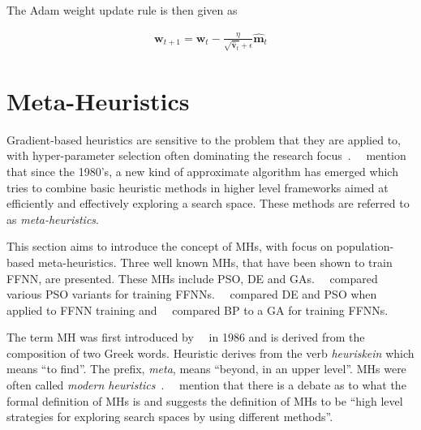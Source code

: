 The \acs{Adam} weight update rule is then given as

\begin{equation}
      \label{eq:heuristics:gd:adam}
      \begin{split}
            \boldsymbol{w}_{t+1} = \boldsymbol{w}_{t} - \frac{\eta}{\sqrt{\hat{\boldsymbol{v}}_{t}} + \epsilon}\hat{\boldsymbol{m}}_{t}
      \end{split}
\end{equation}

\section{Meta-Heuristics}\label{sec:heuristics:mh}

Gradient-based heuristics are sensitive to the problem that they are applied to, with hyper-parameter selection often dominating the research focus~\cite{ref:bengio:2000, ref:feurer:2019}.~\citeauthor{ref:blum:2003}~\cite{ref:blum:2003} mention that since the 1980's, a new kind of approximate algorithm has emerged which tries to combine basic heuristic methods in higher level frameworks aimed at efficiently and effectively exploring a search space. These methods are referred to as \textit{meta-heuristics}.

This section aims to introduce the concept of \acp{MH}, with focus on population-based meta-heuristics. Three well known \acp{MH}, that have been shown to train \acs{FFNN}, are presented. These \acp{MH} include \acf{PSO}, \acf{DE} and \acfp{GA}.~\citeauthor{ref:carvalho:2006}~\cite{ref:carvalho:2006} compared various \acs{PSO} variants for training \acp{FFNN}.~\citeauthor{ref:espinal:2011}~\cite{ref:espinal:2011} compared \acs{DE} and \acs{PSO} when applied to \acs{FFNN} training and~\citeauthor{ref:gupta:1999}~\cite{ref:gupta:1999} compared \acs{BP} to a \acs{GA} for training \acp{FFNN}.

The term \acf{MH} was first introduced by~\citeauthor{ref:glover:1986}~\cite{ref:glover:1986} in 1986 and is derived from the composition of two Greek words. Heuristic derives from the verb \textit{heuriskein} which means ``to find''. The prefix, \textit{meta}, means ``beyond, in an upper level''. \Acp{MH} were often called \textit{modern heuristics}~\cite{ref:reeves:1993}.~\citeauthor{ref:blum:2003}~\cite{ref:blum:2003} mention that there is a debate as to what the formal definition of \acp{MH} is and suggests the definition of \acp{MH} to be ``high level strategies for exploring search spaces by using different methods''.

